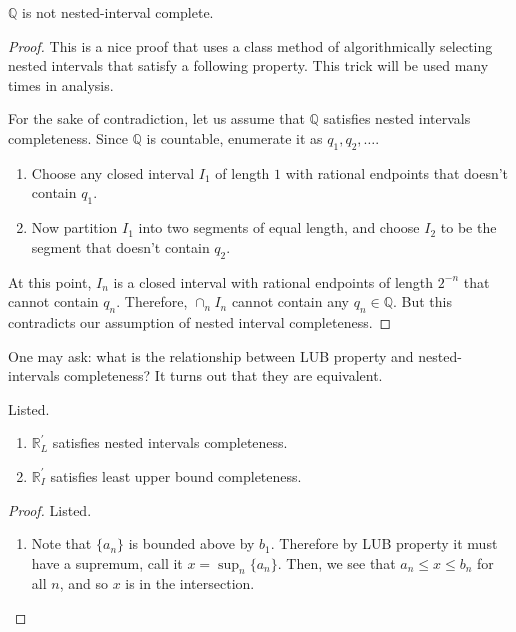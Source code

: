   \begin{theorem}
    $\mathbb{Q}$ is not nested-interval complete. 
  \end{theorem}
  \begin{proof}
    This is a nice proof that uses a class method of algorithmically selecting nested intervals that satisfy a following property. This trick will be used many times in analysis. 
    
    For the sake of contradiction, let us assume that $\mathbb{Q}$ satisfies nested intervals completeness. Since $\mathbb{Q}$ is countable, enumerate it as $q_1, q_2, \ldots$. 
    \begin{enumerate}
      \item Choose any closed interval $I_1$ of length $1$ with rational endpoints that doesn't contain $q_1$. 
      \item Now partition $I_1$ into two segments of equal length, and choose $I_2$ to be the segment that doesn't contain $q_2$.  
    \end{enumerate}
    At this point, $I_n$ is a closed interval with rational endpoints of length $2^{-n}$ that cannot contain $q_n$. Therefore, $\cap_n I_n$ cannot contain any $q_n \in \mathbb{Q}$. But this contradicts our assumption of nested interval completeness.  
  \end{proof} 

  One may ask: what is the relationship between LUB property and nested-intervals completeness? It turns out that they are equivalent. 

  \begin{theorem}
    Listed. 
    \begin{enumerate}
      \item $\mathbb{R}_L^\prime$ satisfies nested intervals completeness. 
      \item $\mathbb{R}_I^\prime$ satisfies least upper bound completeness. 
    \end{enumerate}
  \end{theorem}
  \begin{proof}
    Listed. 
    \begin{enumerate}
      \item Note that $\{a_n\}$ is bounded above by $b_1$. Therefore by LUB property it must have a supremum, call it $x = \sup_n \{a_n\}$. Then, we see that $a_n \leq x \leq b_n$ for all $n$, and so $x$ is in the intersection. 
    \end{enumerate}
  \end{proof}

